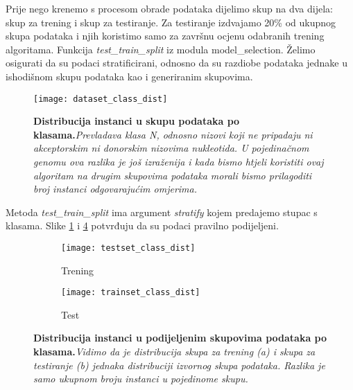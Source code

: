 Prije nego krenemo s procesom obrade podataka dijelimo skup na dva dijela: skup za trening i skup za testiranje. Za testiranje izdvajamo 20\% od ukupnog skupa podataka i njih koristimo samo za završnu ocjenu odabranih trening algoritama. Funkcija \textit{test{\_}train{\_}split} iz modula model{\_}selection. Želimo osigurati da su podaci stratificirani, odnosno da su razdiobe podataka jednake u ishodišnom skupu podataka kao i generiranim skupovima. 
\begin{center}
   \begin{figure}[ht!]
      \begin{center}
         \texttt{[image: dataset\_class\_dist]}
         \caption[Distribucija instanci u skupu podataka]
         {\textbf{Distribucija instanci u skupu podataka po klasama.}\textit{Prevladava klasa N, odnosno nizovi koji ne pripadaju ni akceptorskim ni donorskim nizovima nukleotida. U pojedinačnom genomu ova razlika je još izraženija\cite{Brown01} i kada bismo htjeli koristiti ovaj algoritam na drugim skupovima podataka morali bismo prilagoditi broj instanci odgovarajućim omjerima.}}
         \label{fig:dist_orig}
      \end{center}
   \end{figure}
\end{center}

Metoda \textit{test{\_}train{\_}split} ima argument \textit{stratify} kojem predajemo stupac s klasama. Slike \ref{fig:dist_orig} i \ref{fig:dist_train_test} potvrđuju da su podaci pravilno podijeljeni.

\begin{center}
   \begin{figure}[ht!]
   \begin{subfigure}{.5\textwidth}
         \texttt{[image: testset\_class\_dist]}
         \caption{Trening}
         \label{fig:dist_train}
   \end{subfigure}
   \begin{subfigure}{.5\textwidth}
         \texttt{[image: trainset\_class\_dist]}
         \caption{Test}
         \label{fig:dist_test}
   \end{subfigure}
   \caption[Distribucija instanci u trening i testnom skupu podataka]
   {\textbf{Distribucija instanci u podijeljenim skupovima podataka po klasama.}\textit{Vidimo da je distribucija skupa za trening (a) i skupa za testiranje (b) jednaka distribuciji izvornog skupa podataka. Razlika je samo ukupnom broju instanci u pojedinome skupu.}}
    \label{fig:dist_train_test}
   \end{figure}
\end{center}

